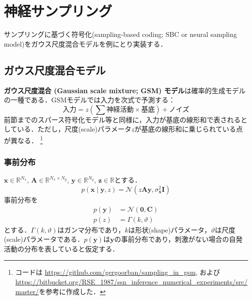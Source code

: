 \section{神経サンプリング}サンプリングに基づく符号化(sampling-based coding; SBC or neural sampling model)をガウス尺度混合モデルを例にとり実装する．
\subsection{ガウス尺度混合モデル}\textbf{ガウス尺度混合 (Gaussian scale mixture; GSM) モデル}は確率的生成モデルの一種である\cite{Wainwright1999-cl}\cite{Orban2016-tm}．GSMモデルでは入力を次式で予測する：
$$
\text{入力}={z}\left(\sum \text{神経活動} \times \text{基底} \right) + \text{ノイズ}
$$
前節までのスパース符号化モデル等と同様に，入力が基底の線形和で表されるとしている．ただし，尺度(scale)パラメータ$z$が基底の線形和に乗じられている点が異なる．
\footnote{
コードは\cite{Orban2016-tm} \url{https://github.com/gergoorban/sampling_in_gsm}, および\cite{Echeveste2020-sh} \url{https://bitbucket.org/RSE_1987/ssn_inference_numerical_experiments/src/master/}を参考に作成した．
}
\subsubsection{事前分布}$\mathbf{x} \in \mathbb{R}^{N_x}$, $\mathbf{A} \in \mathbb{R}^{N_x\times N_y}$, $\mathbf{y} \in \mathbb{R}^{N_y}$, $\mathbf{z} \in \mathbb{R}$とする．
$$
p\left(\mathbf{x}\mid\mathbf{y}, z\right)=\mathcal{N}\left(z \mathbf{A} \mathbf{y}, \sigma_{\mathbf{x}}^{2} \mathbf{I}\right)
$$
事前分布を
$$
\begin{aligned}
p\left(\mathbf{y}\right)&=\mathcal{N}\left(\mathbf{0}, \mathbf{C}\right)\\
p\left(z\right)&=\Gamma (k, \vartheta)
\end{aligned}
$$
とする．$\Gamma(k, \vartheta)$はガンマ分布であり，$k$は形状(shape)パラメータ，$\vartheta$は尺度(scale)パラメータである．$p\left(\mathbf{y}\right)$は$\mathbf{y}$の事前分布であり，刺激がない場合の自発活動の分布を表していると仮定する．